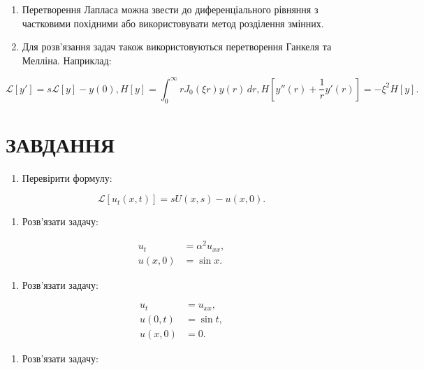 \documentclass[
  ukrainian,
]{article}
\providecommand{\tightlist}{%
  \setlength{\itemsep}{0pt}\setlength{\parskip}{0pt}}
\begin{document}
\begin{enumerate}
\def\labelenumi{\arabic{enumi}.}
\item
  Перетворення Лапласа можна звести до диференціального рівняння з
  частковими похідними або використовувати метод розділення змінних.
\item
  Для розв'язання задач також використовуються перетворення Ганкеля та
  Мелліна. Наприклад:
\end{enumerate}

\[
\mathscr{L}[y'] = s\mathscr{L}[y] - y(0),
H[y] = \int_{0}^{\infty} r J_0(\xi r) y(r)\,dr,
H\left[y''(r)+\frac{1}{r}y'(r)\right] = -\xi^2 H[y].
\]

\section{ЗАВДАННЯ}\label{ux437ux430ux432ux434ux430ux43dux43dux44f-9}

\begin{enumerate}
\def\labelenumi{\arabic{enumi}.}
\tightlist
\item
  Перевірити формулу:
\end{enumerate}

\[
\mathscr{L}[u_t(x,t)] = sU(x,s) - u(x,0).
\]

\begin{enumerate}
\def\labelenumi{\arabic{enumi}.}
\setcounter{enumi}{1}
\tightlist
\item
  Розв'язати задачу:
\end{enumerate}

\[
\begin{aligned}
u_t &= \alpha^2 u_{xx}, \\
u(x,0) &= \sin x.
\end{aligned}
\]

\begin{enumerate}
\def\labelenumi{\arabic{enumi}.}
\setcounter{enumi}{2}
\tightlist
\item
  Розв'язати задачу:
\end{enumerate}

\[
\begin{aligned}
u_t &= u_{xx}, \\
u(0,t) &= \sin t, \\
u(x,0) &= 0.
\end{aligned}
\]

\begin{enumerate}
\def\labelenumi{\arabic{enumi}.}
\setcounter{enumi}{3}
\tightlist
\item
  Розв'язати задачу:
\end{enumerate}
\end{document}

